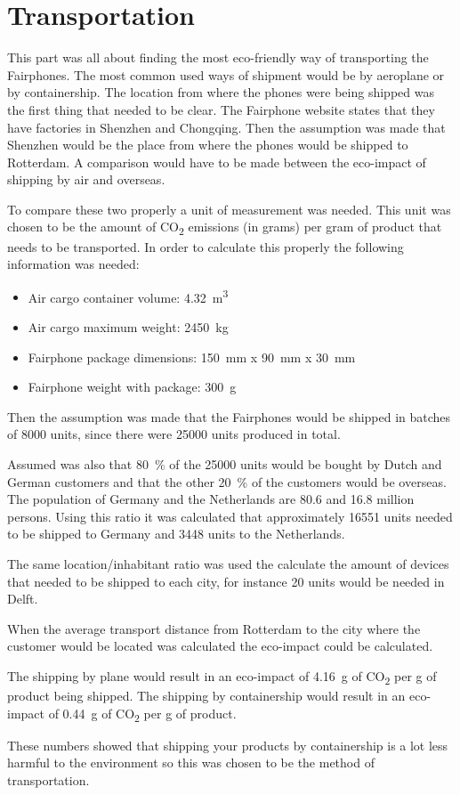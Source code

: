 \documentclass[final]{scrreprt} %
\begin{document}
\chapter{Transportation} %
\label{ch:transportation}

This part was all about finding the most eco-friendly way of transporting the Fairphones.
The most common used ways of shipment would be by aeroplane or by containership.
The location from where the phones were being shipped was the first thing that needed to be clear. 
The Fairphone website states that they have factories in Shenzhen and Chongqing. 
Then the assumption was made that Shenzhen would be the place from where the phones would be shipped to Rotterdam. 
A comparison would have to be made between the eco-impact of shipping by air and overseas.  

To compare these two properly a unit of measurement was needed.
This unit was chosen to be the amount of CO\textsubscript{2} emissions (in grams) per gram of product that needs to be transported.
In order to calculate this properly the following information was needed:

\begin{itemize}
\item Air cargo container volume: \SI{4.32}{\cubic\meter}
\item Air cargo maximum weight: \SI{2450}{\kilo\gram}
\item Fairphone package dimensions: \SI{150}{\milli\meter} x \SI{90}{\milli\meter} x \SI{30}{\milli\meter}
\item Fairphone weight with package: \SI{300}{\gram}
\end{itemize}
Then the assumption was made that the Fairphones would be shipped in batches of \num{8000} units, since there were \num{25000} units produced in total.

Assumed was also that \SI{80}{\percent} of the \num{25000} units would be bought by Dutch and German customers and that the other \SI{20}{\percent} of the customers would be overseas.
The population of Germany and the Netherlands are \num{80.6} and \num{16.8} million persons.
Using this ratio it was calculated that approximately \num{16551} units needed to be shipped to Germany and \num{3448} units to the Netherlands. 

The same location/inhabitant ratio was used the calculate the amount of devices that needed to be shipped to each city, for instance \num{20} units would be needed in Delft.

When the average transport distance from Rotterdam to the city where the customer would be located was calculated the eco-impact could be calculated.
 
The shipping by plane would result in an eco-impact of \SI{4.16}{\gram} of CO\textsubscript{2} per g of product being shipped.
The shipping by containership would result in an eco-impact of \SI{0.44}{\gram} of CO\textsubscript{2} per g of product.

These numbers showed that shipping your products by containership is a lot less harmful to the environment so this was chosen to be the method of transportation.
\end{document}
